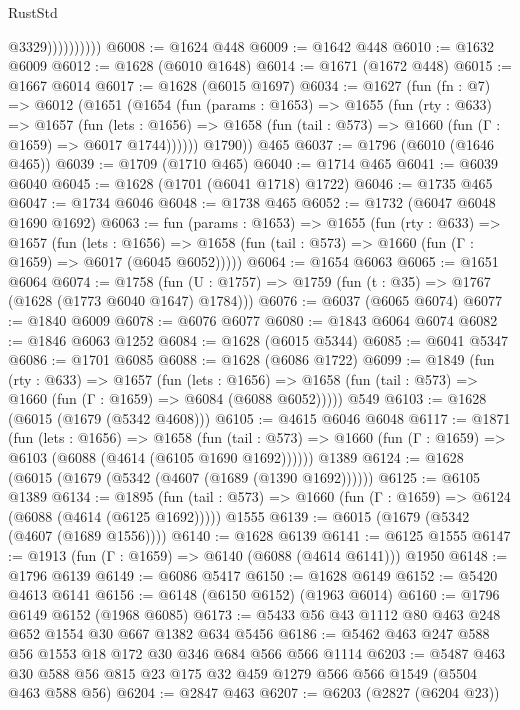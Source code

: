 \begin{lexlean}{RustStd}
\begin{coremodule}
                        @3329))))))))))
@6008 := @1624 @448
@6009 := @1642 @448
@6010 := @1632 @6009
@6012 := @1628 (@6010 @1648)
@6014 := @1671 (@1672 @448)
@6015 := @1667 @6014
@6017 := @1628 (@6015 @1697)
@6034 := @1627
    (fun (fn : @7) =>
    @6012
      (@1651
        (@1654
          (fun (params : @1653) =>
          @1655
            (fun (rty : @633) =>
            @1657
              (fun (lets : @1656) =>
              @1658 (fun (tail : @573) => @1660 (fun (Γ : @1659) => @6017 @1744))))))
        @1790))
    @465
@6037 := @1796 (@6010 (@1646 @465))
@6039 := @1709 (@1710 @465)
@6040 := @1714 @465
@6041 := @6039 @6040
@6045 := @1628 (@1701 (@6041 @1718) @1722)
@6046 := @1735 @465
@6047 := @1734 @6046
@6048 := @1738 @465
@6052 := @1732 (@6047 @6048 @1690 @1692)
@6063 := fun (params : @1653) =>
  @1655
    (fun (rty : @633) =>
    @1657
      (fun (lets : @1656) =>
      @1658 (fun (tail : @573) => @1660 (fun (Γ : @1659) => @6017 (@6045 @6052)))))
@6064 := @1654 @6063
@6065 := @1651 @6064
@6074 := @1758 (fun (U : @1757) => @1759 (fun (t : @35) => @1767 (@1628 (@1773 @6040 @1647) @1784)))
@6076 := @6037 (@6065 @6074)
@6077 := @1840 @6009
@6078 := @6076 @6077
@6080 := @1843 @6064 @6074
@6082 := @1846 @6063 @1252
@6084 := @1628 (@6015 @5344)
@6085 := @6041 @5347
@6086 := @1701 @6085
@6088 := @1628 (@6086 @1722)
@6099 := @1849
    (fun (rty : @633) =>
    @1657
      (fun (lets : @1656) =>
      @1658 (fun (tail : @573) => @1660 (fun (Γ : @1659) => @6084 (@6088 @6052)))))
    @549
@6103 := @1628 (@6015 (@1679 (@5342 @4608)))
@6105 := @4615 @6046 @6048
@6117 := @1871
    (fun (lets : @1656) =>
    @1658
      (fun (tail : @573) => @1660 (fun (Γ : @1659) => @6103 (@6088 (@4614 (@6105 @1690 @1692))))))
    @1389
@6124 := @1628 (@6015 (@1679 (@5342 (@4607 (@1689 (@1390 @1692))))))
@6125 := @6105 @1389
@6134 := @1895
    (fun (tail : @573) => @1660 (fun (Γ : @1659) => @6124 (@6088 (@4614 (@6125 @1692)))))
    @1555
@6139 := @6015 (@1679 (@5342 (@4607 (@1689 @1556))))
@6140 := @1628 @6139
@6141 := @6125 @1555
@6147 := @1913 (fun (Γ : @1659) => @6140 (@6088 (@4614 @6141))) @1950
@6148 := @1796 @6139
@6149 := @6086 @5417
@6150 := @1628 @6149
@6152 := @5420 @4613 @6141
@6156 := @6148 (@6150 @6152) (@1963 @6014)
@6160 := @1796 @6149 @6152 (@1968 @6085)
@6173 := @5433 @56 @43 @1112 @80 @463 @248 @652 @1554 @30 @667 @1382 @634 @5456
@6186 := @5462 @463 @247 @588 @56 @1553 @18 @172 @30 @346 @684 @566 @566 @1114
@6203 := @5487 @463 @30 @588 @56 @815 @23 @175 @32 @459 @1279 @566 @566 @1549 (@5504 @463 @588 @56)
@6204 := @2847 @463
@6207 := @6203 (@2827 (@6204 @23))

\end{coremodule}
\end{lexlean}

